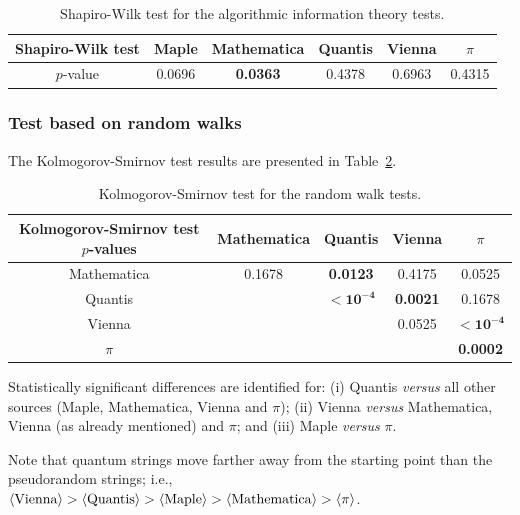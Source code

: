 \documentclass[10pt]{article}%
\begin{document}
\begin{table}
\caption{Shapiro-Wilk test for the algorithmic information theory tests.}\label{tab:12}
\begin{center}
\begin{tabular}
[c]{ c c c c c c }\hline\hline
Shapiro-Wilk test & Maple & Mathematica & Quantis  & Vienna  & $\pi$\\\hline
$p$-value & 0.0696 & \bf{0.0363} &
0.4378 & 0.6963 & 0.4315\\\hline\hline
\end{tabular}
\end{center}
\end{table}


\subsubsection{Test based on random walks}


The Kolmogorov-Smirnov test results are presented in Table~\ref{tab:13}.

\begin{table}
\caption{Kolmogorov-Smirnov test for the random walk tests.}\label{tab:13}
 \begin{center}
 \begin{tabular}
[c]{ c c c c c }
\hline\hline
Kolmogorov-Smirnov test $p$-values & Mathematica & Quantis & Vienna & $\pi$ \\\hline
Mathematica & 0.1678 & \bf{0.0123} & 0.4175 & 0.0525\\
Quantis &  & $\mathbf{< 10^{-4}}$ & \bf{0.0021} & 0.1678\\
Vienna &  &  & 0.0525 & $\mathbf{< 10^{-4}}$\\
$\pi$ &  &  &  & \bf{0.0002}\\\hline\hline
\end{tabular}
\end{center}
\end{table}

Statistically significant differences are identified for:
(i) Quantis {\it versus} all other sources (Maple, Mathematica, Vienna and $\pi$);
(ii) Vienna {\it versus} Mathematica, Vienna (as already
mentioned) and  $\pi$;  and
(iii) Maple {\it versus} $\pi$.


Note that quantum strings move farther away from the starting point than the pseudorandom strings; i.e.,
$\langle  {\rm  Vienna} \rangle >\langle  {\rm  Quantis} \rangle >\langle  {\rm  Maple} \rangle >\langle  {\rm  Mathematica} \rangle >\langle  \pi \rangle $.
\end{document}
